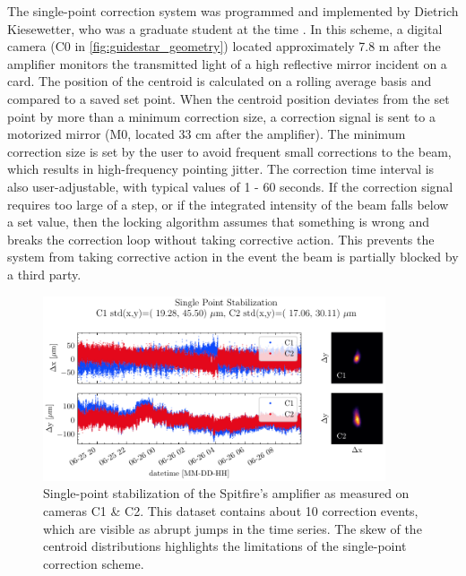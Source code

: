 The single-point correction system was programmed and implemented by Dietrich Kiesewetter, who was a graduate student at the time \cite{kiesewetterDynamicsNearThresholdAttosecond2019}. In this scheme, a digital camera (C0 in \cref{fig:guidestar_geometry}) located approximately 7.8 m after the amplifier monitors the transmitted light of a high reflective mirror incident on a card. The position of the centroid is calculated on a rolling average basis and compared to a saved set point. When the centroid position deviates from the set point by more than a minimum correction size, a correction signal is sent to a motorized mirror (M0, located 33 cm after the amplifier). The minimum correction size is set by the user to avoid frequent small corrections to the beam, which results in high-frequency pointing jitter. The correction time interval is also user-adjustable, with typical values of 1 - 60 seconds. If the correction signal requires too large of a step, or if the integrated intensity of the beam falls below a set value, then the locking algorithm assumes that something is wrong and breaks the correction loop without taking corrective action. This prevents the system from taking corrective action in the event the beam is partially blocked by a third party.

\begin{figure}
	\centering
	\includegraphics[width=0.9\textwidth]{figures/chap2/Stability_Dietrich_ON.pdf}
	\caption{Single-point stabilization of the Spitfire's amplifier as measured on cameras C1 \& C2. This dataset contains about 10 correction events, which are visible as abrupt jumps in the time series. The skew of the centroid distributions highlights the limitations of the single-point correction scheme.}
	\label{fig:guidestar_1point_stability}
\end{figure}

